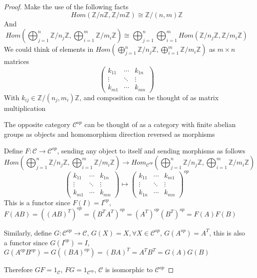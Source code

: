 \documentclass[main]{subfiles}
\begin{document}
\begin{proof}
Make the use of the following facts
\[Hom(\mathbb Z/n\mathbb Z,\mathbb Z/m\mathbb Z)\cong \mathbb Z/(n,m)\mathbb Z\]
And
\[\displaystyle Hom\left(\bigoplus_{j=1}^n\mathbb Z/n_j\mathbb Z,\bigoplus_{i=1}^m\mathbb Z/m_i\mathbb Z\right)\cong\bigoplus_{j=1}^n\bigoplus_{i=1}^m Hom\left(\mathbb Z/n_j\mathbb Z,\mathbb Z/m_i\mathbb Z\right)\]
We could think of elements in $\displaystyle Hom\left(\bigoplus_{j=1}^n\mathbb Z/n_j\mathbb Z,\bigoplus_{i=1}^m\mathbb Z/m_i\mathbb Z\right)$ as $m\times n$ matrices
\[
\begin{pmatrix}
k_{11} &\cdots & k_{1n} \\
\vdots &\ddots & \vdots \\
k_{m1} &\cdots & k_{mn}
\end{pmatrix}
\]
With $k_{ij}\in\mathbb Z/(n_j,m_i)\mathbb Z$, and composition can be thought of as matrix multiplication \par
The opposite category $\mathcal C^{op}$ can be thought of as a category with finite abelian groups as objects and homomorphism direction reversed as morphisms \par
Define $F:\mathcal C\to\mathcal C^{op}$, sending any object to itself and sending morphisms as follows
\[Hom\left(\bigoplus_{j=1}^n\mathbb Z/n_j\mathbb Z,\bigoplus_{i=1}^m\mathbb Z/m_i\mathbb Z\right)\to Hom_{\mathcal C^{op}}\left(\bigoplus_{j=1}^n\mathbb Z/n_j\mathbb Z,\bigoplus_{i=1}^m\mathbb Z/m_i\mathbb Z\right)\]
\[
\begin{pmatrix}
k_{11} &\cdots & k_{1n} \\
\vdots &\ddots & \vdots \\
k_{m1} &\cdots & k_{mn}
\end{pmatrix}
\mapsto
\begin{pmatrix}
k_{11} &\cdots & k_{m1} \\
\vdots &\ddots & \vdots \\
k_{1n} &\cdots & k_{mn}
\end{pmatrix}^{op}
\]
This is a functor since $F(I)=I^{op}$, $F(AB)=\left((AB)^T\right)^{op}=\left(B^TA^T\right)^{op}=\left(A^T\right)^{op}\left(B^T\right)^{op}=F(A)F(B)$ \par
Similarly, define $G:\mathcal C^{op}\to\mathcal C$, $G(X)=X,\forall X\in \mathcal C^{op}$, $G(A^{op})=A^T$, this is also a functor since $G(I^{op})=I$, $G(A^{op}B^{op})=G\left((BA)^{op}\right)=(BA)^T=A^TB^T=G(A)G(B)$ \par
Therefore $GF=1_{\mathcal C}$, $FG=1_{\mathcal C^{op}}$, $\mathcal C$ is isomorphic to $\mathcal C^{op}$ \par

\end{proof}
\end{document}
